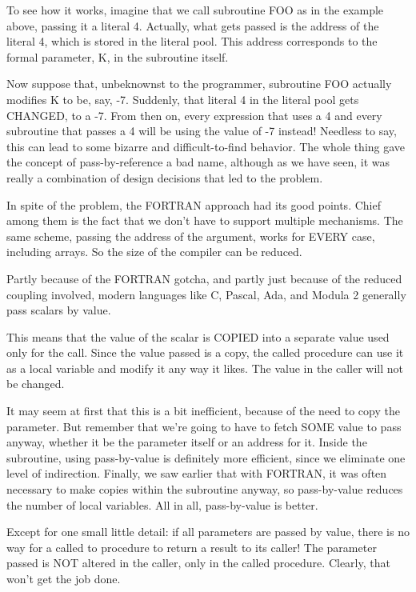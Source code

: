 To  see  how  it works, imagine that we call subroutine FOO as in the example above, passing  it  a literal 4. Actually, what gets passed  is  the  address of the literal 4, which is stored in the literal pool. This address corresponds to the formal parameter, K, in the subroutine itself.

Now suppose that, unbeknownst to the  programmer, subroutine FOO actually modifies K to be, say, -7. Suddenly, that literal  4 in the literal pool  gets  CHANGED, to  a  -7. From then on, every expression that uses  a  4  and  every subroutine that passes a 4 will be using the value of -7 instead!  Needless to say, this can lead to some  bizarre  and difficult-to-find behavior. The whole thing gave  the concept of pass-by-reference a bad name, although as we have seen, it was really a combination of  design decisions that led to the problem.

In spite of  the  problem, the  FORTRAN  approach  had  its good points. Chief  among them is the fact that we  don't  have  to support  multiple  mechanisms. The  same  scheme, passing the address of  the argument, works for EVERY case, including arrays. So the size of the compiler can be reduced.

Partly because of the FORTRAN  gotcha, and partly just because of the reduced coupling involved, modern languages  like  C, Pascal, Ada, and Modula 2 generally pass scalars by value.

This means that the value of the scalar is COPIED into a separate value  used only for the call. Since the value passed is a copy, the called procedure can use it as a local variable and modify it any way it likes. The value in the caller will not be changed.

It may seem at first that  this  is a bit inefficient, because of the need to copy the parameter. But remember that we're going to have  to  fetch SOME value to pass  anyway, whether  it  be  the parameter  itself  or  an address for it. Inside the subroutine, using  pass-by-value  is  definitely  more  efficient, since  we eliminate one level of indirection. Finally, we saw earlier that with  FORTRAN, it  was often necessary to make copies within the subroutine anyway, so pass-by-value reduces the  number  of local variables. All in all, pass-by-value is better.

Except for one small little detail:  if all parameters are passed by value, there is no way for a called to  procedure  to return a result to its caller!  The parameter passed is NOT altered in the caller, only  in  the called procedure. Clearly, that won't get the job done.


